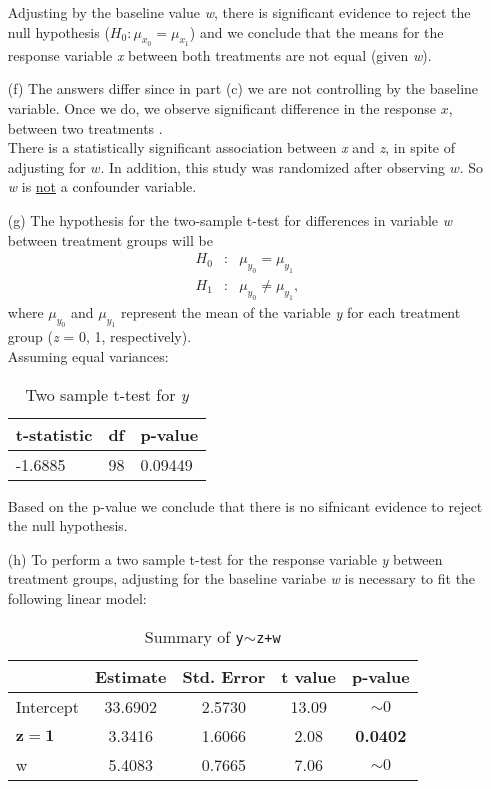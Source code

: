 \documentclass[11pt,a4paper]{article}
\begin{document}
\begin{enumerate}
Adjusting by the baseline value \emph{w}, there is significant evidence to reject the null hypothesis ($H_0:\mu_{x_0} =\mu_{x_1}$)
 and we conclude that the means for the response variable \emph{x} between both treatments are not equal (given \emph{w}). 



\item[(f)] 
The answers differ since in part (c) we are not controlling by the baseline variable. Once we do, we observe 
significant difference in the response $x$, between two treatments .\\
There is a statistically significant association between \emph{x} and \emph{z}, in spite of adjusting for $w$. In addition, this study was randomized after observing $w$. 
So \emph{w} is {\underline{not}} a confounder variable. 

\item[(g)]
The hypothesis for the two-sample t-test for differences in variable \emph{w} between treatment 
groups will be
\begin{eqnarray*}
  H_0 &:& \mu_{y_0} =\mu_{y_1}\\
  H_1 &:& \mu_{y_0} \neq \mu_{y_1},
\end{eqnarray*}
where $\mu_{y_0}$ and $\mu_{y_1}$ represent the mean of the variable \emph{y} for each treatment group (\emph{z} = 0, 1, respectively).\\
Assuming equal variances:
\begin{table}[h!]
\centering
\begin{tabular}{lll}
\hline
t-statistic & df & p-value\\
\hline
-1.6885 & 98 & 0.09449\\
\hline
\end{tabular}
\caption{Two sample t-test for \emph{y}}
\end{table}

Based on the p-value we conclude that there is no sifnicant evidence to reject the null hypothesis. 

\item[(h)]
To perform a two sample t-test for the response variable \emph{y} between treatment groups, adjusting for the baseline variabe 
\emph{w} is necessary to fit the following linear model:
\begin{table}[H]
\centering
\begin{tabular}{lcccc}
  \hline
 & Estimate & Std. Error & t value & p-value \\ 
  \hline
Intercept & 33.6902 & 2.5730 & 13.09 & $\sim 0$ \\ 
   $\mathbf{z=1}$ & 3.3416 & 1.6066 & 2.08 & \textbf{0.0402} \\ 
  w & 5.4083 & 0.7665 & 7.06 & $\sim 0$ \\ 
   \hline
\end{tabular}
\caption{Summary of \texttt{y$\sim$z+w} }
\end{table}


\end{enumerate}
\end{document}

